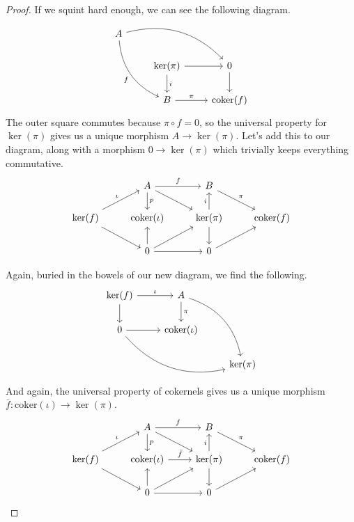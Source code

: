 \documentclass[a4paper,10pt]{scrreprt}
\newcommand{\coker}{\mathrm{coker}}
\theoremstyle{definition}
\theoremstyle{plain}
\theoremstyle{remark}
\begin{document}
\begin{proof}
  If we squint hard enough, we can see the following diagram.
  \begin{equation*}
    \begin{tikzcd}
      A
      \arrow[rrd, bend left]
      \arrow[rdd, bend right, swap, "f"]
      \\
      & \ker(\pi)
      \arrow[r]
      \arrow[d, "i"]
      & 0
      \arrow[d]
      \\
      & B
      \arrow[r, "\pi"]
      & \coker(f)
    \end{tikzcd}
  \end{equation*}
  The outer square commutes because $\pi \circ f = 0$, so the universal property for $\ker(\pi)$ gives us a unique morphism $A \to \ker(\pi)$. Let's add this to our diagram, along with a morphism $0 \to \ker(\pi)$ which trivially keeps everything commutative.
  \begin{equation*}
    \begin{tikzcd}
      & A
      \arrow[r, "f"]
      \arrow[d, "p"]
      \arrow[dr]
      & B
      \arrow[dr, "\pi"]
      \\
      \ker(f)
      \arrow[ur, "\iota"]
      \arrow[dr]
      & \coker(\iota)
      & \ker(\pi)
      \arrow[u, "i"]
      \arrow[d]
      & \coker(f)
      \\
      & 0
      \arrow[u]
      \arrow[r]
      \arrow[ur]
      & 0
      \arrow[ur]
    \end{tikzcd}
  \end{equation*}

  Again, buried in the bowels of our new diagram, we find the following.
  \begin{equation*}
    \begin{tikzcd}
      \ker(f)
      \arrow[r, "\iota"]
      \arrow[d]
      & A
      \arrow[d, "\pi"]
      \arrow[ddr, bend left]
      \\
      0
      \arrow[r]
      \arrow[drr, bend right]
      & \coker(\iota)
      \\
      & & \ker(\pi)
    \end{tikzcd}
  \end{equation*}
  And again, the universal property of cokernels gives us a unique morphism $\bar{f}\colon \coker(\iota) \to \ker(\pi)$.
  \begin{equation*}
    \begin{tikzcd}
      & A
      \arrow[r, "f"]
      \arrow[d, "p"]
      \arrow[dr]
      & B
      \arrow[dr, "\pi"]
      \\
      \ker(f)
      \arrow[ur, "\iota"]
      \arrow[dr]
      & \coker(\iota)
      \arrow[r, "\bar{f}"]
      & \ker(\pi)
      \arrow[u, "i"]
      \arrow[d]
      & \coker(f)
      \\
      & 0
      \arrow[u]
      \arrow[r]
      \arrow[ur]
      & 0
      \arrow[ur]
    \end{tikzcd}
  \end{equation*}


\end{proof}
\end{document}
